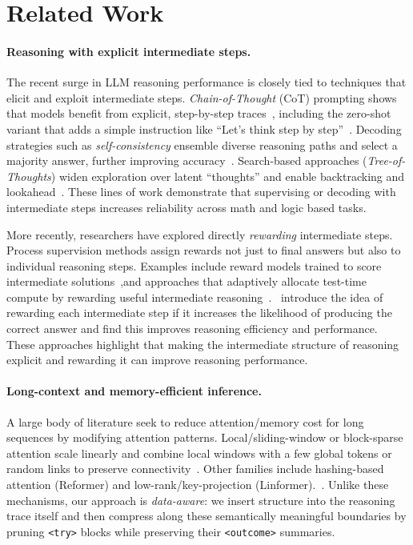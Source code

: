 \documentclass{article}
\begin{document}
\section{Related Work}
\paragraph{Reasoning with explicit intermediate steps.}
The recent surge in LLM reasoning performance is closely tied to techniques that elicit and exploit intermediate steps. \emph{Chain-of-Thought} (CoT) prompting shows that models benefit from explicit, step-by-step traces~\citep{wei2022chain}, including the zero-shot variant that adds a simple instruction like ``Let's think step by step''~\citep{kojima2022large}. Decoding strategies such as \emph{self-consistency} ensemble diverse reasoning paths and select a majority answer, further improving accuracy~\citep{wang2022self}. Search-based approaches (\emph{Tree-of-Thoughts}) widen exploration over latent ``thoughts'' and enable backtracking and lookahead~\citep{yao2023tree}. These lines of work demonstrate that supervising or decoding with intermediate steps increases reliability across math and logic based tasks. 

More recently, researchers have explored directly \emph{rewarding} intermediate steps. Process supervision methods assign rewards not just to final answers but also to individual reasoning steps. Examples include reward models trained to score intermediate solutions~\citep{lightman2023let,uesato2022solving},and approaches that adaptively allocate test-time compute by rewarding useful intermediate reasoning~\citep{snell2024scaling}.~\cite{qu2025optimizing} introduce the idea of rewarding each intermediate step if it increases the likelihood of producing the correct answer and find this improves reasoning efficiency and performance. These approaches highlight that making the intermediate structure of reasoning explicit and rewarding it can improve reasoning performance.

\paragraph{Long-context and memory-efficient inference.}
A large body of literature seek to reduce attention/memory cost for long sequences by modifying attention patterns. Local/sliding-window or block-sparse attention scale linearly and combine local windows with a few global tokens or random links to preserve connectivity~\citep{beltagy2020longformer,zaheer2020big}. Other families include hashing-based attention (Reformer) and low-rank/key-projection (Linformer).~\citep{kitaev2020reformer,wang2020linformer}. Unlike these mechanisms, our approach is \emph{data-aware}: we insert structure into the reasoning trace itself and then compress along these semantically meaningful boundaries by pruning \texttt{<try>} blocks while preserving their \texttt{<outcome>} summaries.
\end{document}
